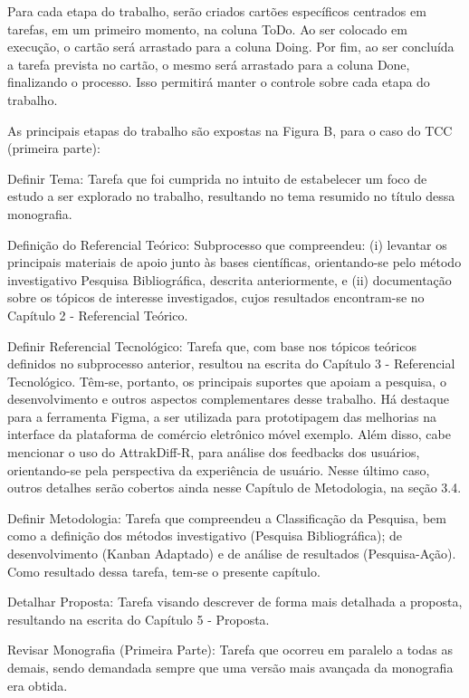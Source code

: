 Para cada etapa do trabalho, serão criados cartões específicos centrados em tarefas, em um primeiro momento, na coluna ToDo. Ao ser colocado em execução, o cartão será arrastado para a coluna Doing. Por fim, ao ser concluída a tarefa prevista no cartão, o mesmo será arrastado para a coluna Done, finalizando o processo. Isso permitirá manter o controle sobre cada etapa do trabalho.

As principais etapas do trabalho são expostas na Figura B, para o caso do TCC (primeira parte):

Definir Tema: Tarefa que foi cumprida no intuito de estabelecer um foco de estudo a ser explorado no trabalho, resultando no tema resumido no título dessa monografia. 

Definição do Referencial Teórico: Subprocesso que compreendeu: (i) levantar os principais materiais de apoio junto às bases científicas, orientando-se pelo método investigativo Pesquisa Bibliográfica, descrita anteriormente, e (ii) documentação sobre os tópicos de interesse investigados, cujos resultados encontram-se no Capítulo 2 - Referencial Teórico.

Definir Referencial Tecnológico: Tarefa que, com base nos tópicos teóricos definidos no subprocesso anterior, resultou na escrita do Capítulo 3 - Referencial Tecnológico. Têm-se, portanto, os principais suportes que apoiam a pesquisa, o desenvolvimento e outros aspectos complementares desse trabalho. Há destaque para a ferramenta Figma, a ser utilizada para prototipagem das melhorias na interface da plataforma de comércio eletrônico móvel exemplo. Além disso, cabe mencionar o uso do AttrakDiff-R, para análise dos feedbacks dos usuários, orientando-se pela perspectiva da experiência de usuário. Nesse último caso, outros detalhes serão cobertos ainda nesse Capítulo de Metodologia, na seção 3.4.

Definir Metodologia: Tarefa que compreendeu a Classificação da Pesquisa, bem como a definição dos métodos investigativo (Pesquisa Bibliográfica); de desenvolvimento (Kanban Adaptado) e de análise de resultados (Pesquisa-Ação). Como resultado dessa tarefa, tem-se o presente capítulo.

Detalhar Proposta: Tarefa visando descrever de forma mais detalhada a proposta, resultando na escrita do Capítulo 5 - Proposta.

Revisar Monografia (Primeira Parte): Tarefa que ocorreu em paralelo a todas as demais, sendo demandada sempre que uma versão mais avançada da monografia era obtida.

